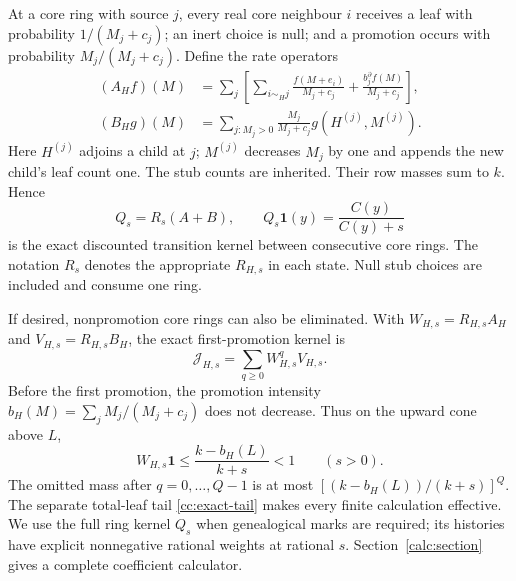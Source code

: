 At a core ring with source $j$, every real core neighbour $i$ receives
a leaf with probability $1/(M_j+c_j)$; an inert choice is null; and
a promotion occurs with probability $M_j/(M_j+c_j)$. Define the rate
operators
\begin{align}
 (A_Hf)(M)
 &=\sum_j\left[
   \sum_{i\sim_Hj}\frac{f(M+e_i)}{M_j+c_j}
   +\frac{b_j^\partial f(M)}{M_j+c_j}\right],
   \label{model:A}\\
 (B_Hg)(M)
 &=\sum_{j:M_j>0}\frac{M_j}{M_j+c_j}
      g(H^{(j)},M^{(j)}).
   \label{model:B}
\end{align}
Here $H^{(j)}$ adjoins a child at $j$; $M^{(j)}$ decreases $M_j$ by one
and appends the new child's leaf count one. The stub counts are inherited.
Their row masses sum to $k$. Hence
\begin{equation}\label{model:Q}
 Q_s=R_s(A+B),\qquad Q_s\mathbf1(y)=\frac{C(y)}{C(y)+s}
\end{equation}
is the exact discounted transition kernel between consecutive core
rings. The notation $R_s$ denotes the appropriate $R_{H,s}$ in each
state. Null stub choices are included and consume one ring.

If desired, nonpromotion core rings can also be eliminated. With
$W_{H,s}=R_{H,s}A_H$ and $V_{H,s}=R_{H,s}B_H$, the exact first-promotion
kernel is
\begin{equation}\label{model:first-promotion}
 \mathcal J_{H,s}=\sum_{q\ge0}W_{H,s}^qV_{H,s}.
\end{equation}
Before the first promotion, the promotion intensity
$b_H(M)=\sum_jM_j/(M_j+c_j)$ does not decrease. Thus on the upward
cone above $L$,
\[
 W_{H,s}\mathbf1\le\frac{k-b_H(L)}{k+s}<1\qquad(s>0).
\]
The omitted mass after $q=0,\ldots,Q-1$ is at most
$[(k-b_H(L))/(k+s)]^Q$. The separate total-leaf tail
\eqref{cc:exact-tail} makes every finite calculation effective.
We use the full ring kernel $Q_s$ when genealogical marks are required;
its histories have explicit nonnegative rational weights at rational
$s$. Section~\ref{calc:section} gives a complete coefficient calculator.
